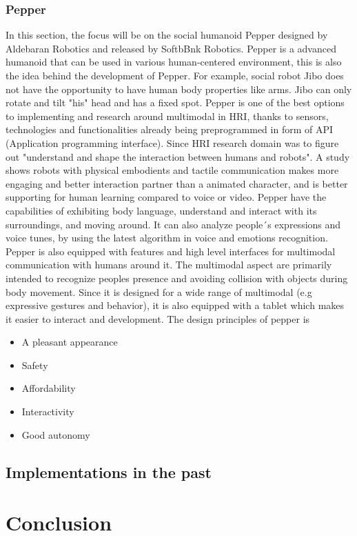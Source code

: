 \documentclass[fleqn,10pt]{wlscirep}
\begin{document}
\subsubsection{Pepper}
 In this section, the focus will be on the social humanoid Pepper designed by Aldebaran Robotics and released by SoftbBnk Robotics. Pepper is a advanced humanoid that can be used in various human-centered environment, this is also the idea behind the development of Pepper. For example, social robot Jibo does not have the opportunity to have human body properties like arms. Jibo can only rotate and tilt "his" head and has a fixed spot.
Pepper is one of the best options to implementing and research around multimodal in HRI, thanks to sensors, technologies and functionalities already being  preprogrammed in form of API (Application programming interface). Since HRI research domain was to figure out "understand and shape the interaction between humans and robots". A study shows  robots with physical embodients and tactile communication makes more engaging and  better interaction partner than a animated character, and is better supporting for human learning compared to voice or video. 
Pepper have the capabilities of exhibiting body language, understand and interact with its surroundings, and moving around. It can also analyze people´s expressions and voice tunes, by using the latest algorithm in voice and emotions recognition. Pepper is also equipped with features and high level interfaces for multimodal communication with humans around it. The multimodal aspect are primarily intended to recognize peoples presence and avoiding collision with objects during body movement. Since it is designed for a wide range of multimodal (e.g expressive gestures and behavior), it is also equipped with a tablet which makes it easier to interact and development. The design principles of pepper is 
\begin{itemize}
    \item A pleasant appearance
    \item Safety    
    \item Affordability
    \item Interactivity
    \item Good autonomy
\end{itemize}


\subsection{Implementations in the past}

\subsection{}

\section{Conclusion}



\end{document}

